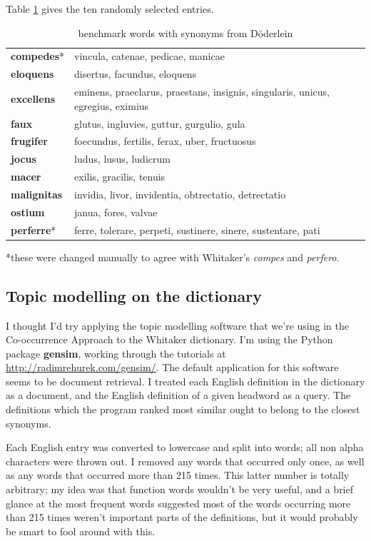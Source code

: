 \documentclass[]{article}
\begin{document}
		Table \ref{doderlein} gives the ten randomly selected entries.
		
		\begin{table}			
		\caption{benchmark words with synonyms from Döderlein\label{doderlein}}
		\vspace{.25in}
		\begin{tabular}{ll}
		\textbf{compedes}* & vincula, catenae, pedicae, manicae\\
		\textbf{eloquens} & disertus, facundus, eloquens\\
		\textbf{excellens} & eminens, praeclarus, praestans, insignis, singularis, unicus, egregius, eximius\\
		\textbf{faux} & glutus, ingluvies, guttur, gurgulio, gula\\
		\textbf{frugifer} & foecundus, fertilis, ferax, uber, fructuosus\\
		\textbf{jocus} & ludus, lusus, ludicrum\\
		\textbf{macer} & exilis, gracilis, tenuis\\
		\textbf{malignitas} & invidia, livor, invidentia, obtrectatio, detrectatio\\
		\textbf{ostium} & janua, fores, valvae\\
		\textbf{perferre}* & ferre, tolerare, perpeti, sustinere, sinere, sustentare, pati\\
		\end{tabular}

		\vspace{.125in}
		*these were changed manually to agree with Whitaker's \textit{compes} and \textit{perfero}.
		\end{table}
		
	\subsection{Topic modelling on the dictionary}
	
		I thought I'd try applying the topic modelling software that we're using in the Co-occurrence Approach to the Whitaker dictionary.  I'm using the Python package \textbf{gensim}, working through the tutorials at \url{http://radimrehurek.com/gensim/}. The default application for this software seems to be document retrieval.  I treated each English definition in the dictionary as a document, and the English definition of a given headword as a query.  The definitions which the program ranked most similar ought to belong to the closest synonyms.
		
		Each English entry was converted to lowercase and split into words; all non alpha characters were thrown out.  I removed any words that occurred only once, as well as any words that occurred more than 215 times.  This latter number is totally arbitrary; my idea was that function words wouldn't be very useful, and a brief glance at the most frequent words suggested most of the words occurring more than 215 times weren't important parts of the definitions, but it would probably be smart to fool around with this.
		
\end{document}
